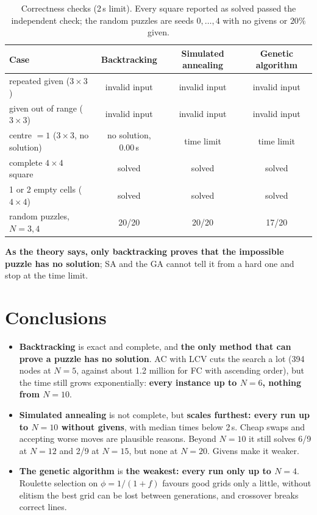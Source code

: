 \documentclass[11pt,a4paper]{article}
\begin{document}
\begin{table}[H]
\centering
\small
\begin{tabular}{@{}l ccc@{}}
\toprule
Case & Backtracking & Simulated annealing & Genetic algorithm \\
\midrule
repeated given ($3\times3$)          & invalid input & invalid input & invalid input \\
given out of range ($3\times3$)      & invalid input & invalid input & invalid input \\
centre $=1$ ($3\times3$, no solution) & no solution, 0.00\,s & time limit & time limit \\
complete $4\times4$ square           & solved & solved & solved \\
1 or 2 empty cells ($4\times4$)      & solved & solved & solved \\
random puzzles, $N=3,4$              & 20/20 & 20/20 & 17/20 \\
\bottomrule
\end{tabular}
\caption{Correctness checks (2\,s limit). Every square reported as solved
passed the independent check; the random puzzles are seeds $0,\dots,4$ with no givens or
$20\%$ given.}
\label{tab:checks}
\end{table}

\noindent \textbf{As the theory says, only backtracking proves that the
impossible puzzle has no solution}; SA and the GA cannot tell it from a
hard one and stop at the time limit.

\section{Conclusions}
\label{sec:conclusions}

\begin{itemize}[nosep]
  \item \textbf{Backtracking} is exact and complete, and \textbf{the only
        method that can prove a puzzle has no solution}. AC with LCV cuts
        the search a lot (394 nodes at $N=5$, against about 1.2 million for FC with
        ascending order),
        but the time still grows exponentially: \textbf{every instance up to
        $N=6$, nothing from $N=10$}.
  \item \textbf{Simulated annealing} is not complete, but \textbf{scales
        furthest: every run up to $N=10$ without givens}, with median times
        below 2\,s. Cheap swaps and accepting worse moves are plausible
        reasons. Beyond $N=10$ it still solves 6/9 at $N=12$ and 2/9 at
        $N=15$, but none at $N=20$. Givens make it weaker.
  \item \textbf{The genetic algorithm} is \textbf{the weakest: every run
        only up to $N=4$}. Roulette selection on $\phi=1/(1+f)$ favours good
        grids only a little, without elitism the best grid can be lost
        between generations, and crossover breaks correct lines.
\end{itemize}
\end{document}
